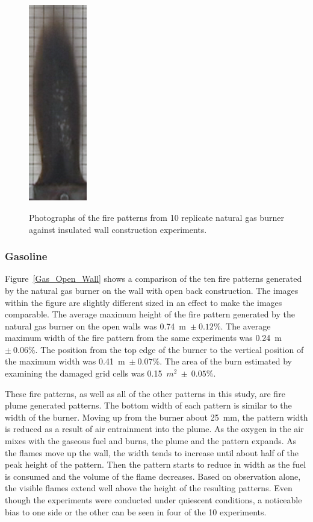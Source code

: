 \documentclass[twoside]{uocthesis}
\begin{document}
{\begin{figure}[p]
	\includegraphics[width=1.0in]{../Figures/GBNG33} \\

	\caption[Photographs of the fire patterns from 10 replicate natural gas burner against insulated wall construction experiments.]{Photographs of the fire patterns from 10 replicate natural gas burner against insulated wall construction experiments.}
	\label{NG_Insulated_Wall}
\end{figure}

\subsubsection{Gasoline}

Figure~\ref{Gas_Open_Wall} shows a comparison of the ten fire patterns generated by the natural gas burner on the wall with open back construction.  The images within the figure are slightly different sized in an effect to make the images comparable.
The average maximum height of the fire pattern generated by the natural gas burner on the open walls was 0.74~m~$\pm~0.12\%$.  The average maximum width of the fire pattern from the same experiments was 0.24~m~$\pm~0.06\%$.  The position from the top edge of the burner to the vertical position of the maximum width was 0.41~m~$\pm~0.07\%$. The area of the burn estimated by examining the damaged grid cells was 0.15~$m^2~\pm~0.05\%$.  

These fire patterns, as well as all of the other patterns in this study, are fire plume generated patterns. The bottom width of each pattern is similar to the width of the burner. Moving up from the burner about 25~mm, the pattern width is reduced as a result of air entrainment into the plume.  As the oxygen in the air mixes with the gaseous fuel and burns, the plume and the pattern expands.  As the flames move up the wall, the width tends to increase until about half of the peak height of the pattern.  Then the pattern starts to reduce in width as the fuel is consumed and the volume of the flame decreases.  Based on observation alone, the visible flames extend well above the height of the resulting patterns.  Even though the experiments were conducted under quiescent conditions, a noticeable bias to one side or the other can be seen in four of the 10 experiments.           

}
\end{document}
